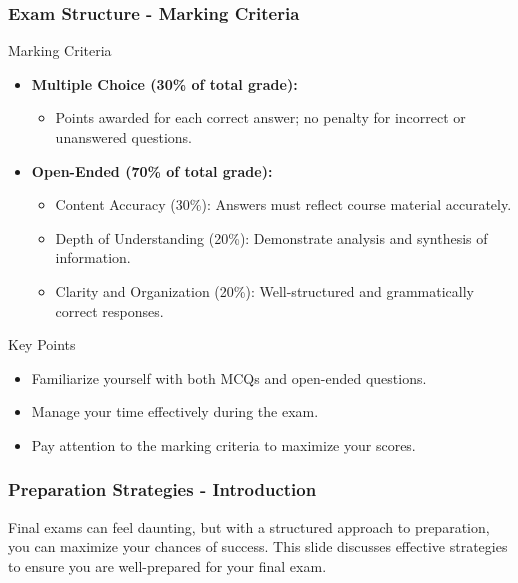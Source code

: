\documentclass{beamer}
\begin{document}
\begin{frame}[fragile]
    \frametitle{Exam Structure - Marking Criteria}
    \begin{block}{Marking Criteria}
        \begin{itemize}
            \item \textbf{Multiple Choice (30\% of total grade):}
                \begin{itemize}
                    \item Points awarded for each correct answer; no penalty for incorrect or unanswered questions.
                \end{itemize}
            \item \textbf{Open-Ended (70\% of total grade):}
                \begin{itemize}
                    \item Content Accuracy (30\%): Answers must reflect course material accurately.
                    \item Depth of Understanding (20\%): Demonstrate analysis and synthesis of information.
                    \item Clarity and Organization (20\%): Well-structured and grammatically correct responses.
                \end{itemize}
        \end{itemize}
    \end{block}
    \begin{block}{Key Points}
        \begin{itemize}
            \item Familiarize yourself with both MCQs and open-ended questions.
            \item Manage your time effectively during the exam.
            \item Pay attention to the marking criteria to maximize your scores.
        \end{itemize}
    \end{block}
\end{frame}

\begin{frame}[fragile]
    \frametitle{Preparation Strategies - Introduction}
    Final exams can feel daunting, but with a structured approach to preparation, you can maximize your chances of success. This slide discusses effective strategies to ensure you are well-prepared for your final exam.
\end{frame}
\end{document}
